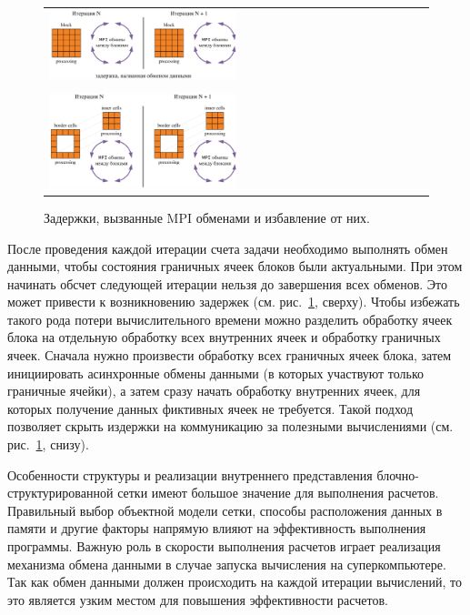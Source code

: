 \begin{figure}[ht]
\centering
\begin{tabular}{l}
\includegraphics[width=0.5\textwidth]{fig/par_11-mpi1.png}
\\
\\
\includegraphics[width=0.5\textwidth]{fig/par_12-mpi2.png}
\end{tabular}
\singlespacing
{}\caption{Задержки, вызванные MPI обменами и избавление от них.}
\label{fig:text_2_block_mpi1}
\end{figure}

После проведения каждой итерации счета задачи необходимо выполнять обмен данными, чтобы состояния граничных ячеек блоков были актуальными.
При этом начинать обсчет следующей итерации нельзя до завершения всех обменов.
Это может привести к возникновению задержек (см. рис.~\ref{fig:text_2_block_mpi1}, сверху).
Чтобы избежать такого рода потери вычислительного времени можно разделить обработку ячеек блока на отдельную обработку всех внутренних ячеек и обработку граничных ячеек.
Сначала нужно произвести обработку всех граничных ячеек блока, затем инициировать асинхронные обмены данными (в которых участвуют только граничные ячейки), а затем сразу начать обработку внутренних ячеек, для которых получение данных фиктивных ячеек не требуется.
Такой подход позволяет скрыть издержки на коммуникацию за полезными вычислениями (см. рис.~\ref{fig:text_2_block_mpi1}, снизу).

Особенности структуры и реализации внутреннего представления блочно-структурированной сетки имеют большое значение для выполнения расчетов.
Правильный выбор объектной модели сетки, способы расположения данных в памяти и другие факторы напрямую влияют на эффективность выполнения программы.
Важную роль в скорости выполнения расчетов играет реализация механизма обмена данными в случае запуска вычисления на суперкомпьютере.
Так как обмен данными должен происходить на каждой итерации вычислений, то это является узким местом для повышения эффективности расчетов.

